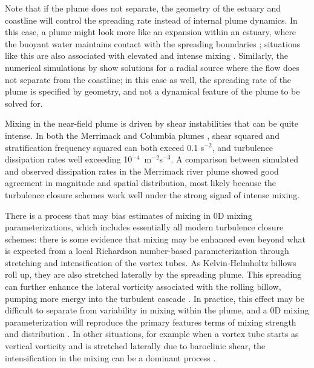 \documentclass[12pt]{article}
\begin{document}
{Note that if the plume does not separate, the geometry of the estuary and coastline will control the spreading rate instead of internal plume dynamics. In this case, a plume might look more like an expansion within an estuary, where the buoyant water maintains contact with the spreading boundaries \citep[see][]{geyer.ea:17}; situations like this are also associated with elevated and intense mixing \citep{geyer.ea:10}. Similarly, the numerical simulations by \citet{odonnell:90} show solutions for a radial source where the flow does not separate from the coastline; in this case as well, the spreading rate of the plume is specified by geometry, and not a dynamical feature of the plume to be solved for.


Mixing in the near-field plume is driven by shear instabilities that can be quite intense. In both the Merrimack \citep{macdonald.ea:07} and Columbia plumes \citep{nash.ea:09}, shear squared and stratification frequency squared can both exceed 0.1 s$^{-2}$, and turbulence dissipation rates well exceeding 10$^{-4}$~m$^{-2}$s$^{-3}$. A comparison between simulated and observed dissipation rates in the Merrimack river plume \citep{macdonald.ea:07} showed good agreement in magnitude and spatial distribution, most likely because the turbulence closure schemes work well under the strong signal of intense mixing. 

There is a process that may bias estimates of mixing in 0D mixing parameterizations, which includes essentially all modern turbulence closure schemes: there is some evidence that mixing may be enhanced even beyond what is expected from a local Richardson number-based parameterization through stretching and intensification of the vortex tubes. As Kelvin-Helmholtz billows roll up, they are also stretched laterally by the spreading plume. This spreading can further enhance the lateral vorticity associated with the rolling billow, pumping more energy into the turbulent cascade \citep{macdonald.chen:12}. In practice, this effect may be difficult to separate from variability in mixing within the plume, and a 0D mixing parameterization will reproduce the primary features terms of mixing strength and distribution \citep{macdonald.ea:07}. In other situations, for example when a vortex tube starts as vertical vorticity and is stretched laterally due to baroclinic shear, the intensification in the mixing can be a dominant process \citep[e.g.,][]{farmer.ea:02}.

}
\end{document}
